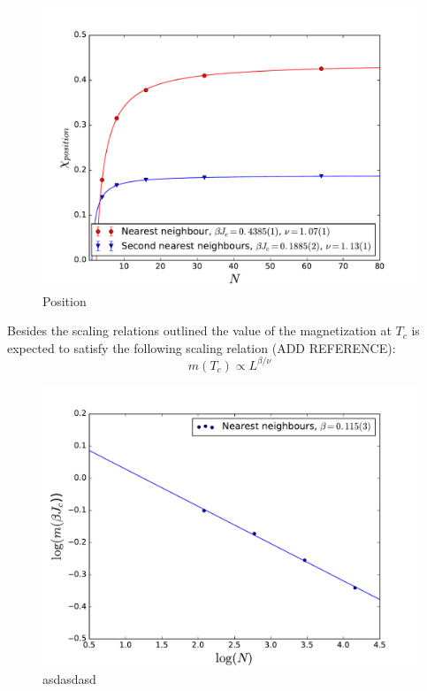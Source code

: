 \documentclass[twoside]{article}
\begin{document}
\begin{multicols}{2}
\begin{figure}[H]
\includegraphics[width=\textwidth]{images/plot_pos.pdf}
\caption{Position}
\label{scaling_pos}
\end{figure}

Besides the scaling relations outlined the value of the magnetization at $T_c$ is expected to satisfy the following scaling relation (ADD REFERENCE):
\begin{equation}
m(T_c) \propto L^{\beta/\nu}
\end{equation}

\begin{figure}[H]
\centering
\includegraphics[scale=0.4]{images/plot_magnetization.pdf}
\caption{asdasdasd}
\end{figure}




\end{multicols}
\end{document}
